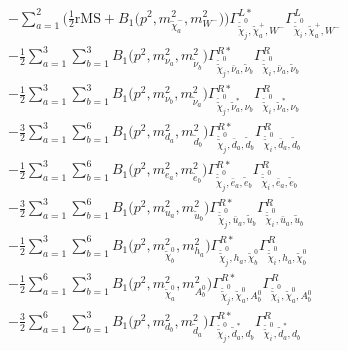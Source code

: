 \begin{itemize}
\begin{align}
 &- \sum_{a=1}^{2}\Big(\frac{1}{2} \text{rMS}  + {B_1\Big(p^{2},m^2_{\tilde{\chi}^-_{{a}}},m^2_{W^-}\Big)}\Big){\Gamma^{L*}_{\check{\tilde{\chi}}^0_{{j}},\tilde{\chi}^+_{{a}},W^-}} {\Gamma^L_{\check{\tilde{\chi}}^0_{{i}},\tilde{\chi}^+_{{a}},W^-}}  \nonumber \\ 
 &-\frac{1}{2} \sum_{a=1}^{3}\sum_{b=1}^{3}{B_1\Big(p^{2},m^2_{\nu_{{a}}},m^2_{\tilde{\nu}_{{b}}}\Big)} {\Gamma^{R*}_{\check{\tilde{\chi}}^0_{{j}},\bar{\nu}_{{a}},\tilde{\nu}_{{b}}}} {\Gamma^R_{\check{\tilde{\chi}}^0_{{i}},\bar{\nu}_{{a}},\tilde{\nu}_{{b}}}}  \nonumber \\ 
 &-\frac{1}{2} \sum_{a=1}^{3}\sum_{b=1}^{3}{B_1\Big(p^{2},m^2_{\nu_{{b}}},m^2_{\tilde{\nu}_{{a}}}\Big)} {\Gamma^{R*}_{\check{\tilde{\chi}}^0_{{j}},\tilde{\nu}^*_{{a}},\nu_{{b}}}} {\Gamma^R_{\check{\tilde{\chi}}^0_{{i}},\tilde{\nu}^*_{{a}},\nu_{{b}}}}  \nonumber \\ 
 &-\frac{3}{2} \sum_{a=1}^{3}\sum_{b=1}^{6}{B_1\Big(p^{2},m^2_{d_{{a}}},m^2_{\tilde{d}_{{b}}}\Big)} {\Gamma^{R*}_{\check{\tilde{\chi}}^0_{{j}},\bar{d}_{{a}},\tilde{d}_{{b}}}} {\Gamma^R_{\check{\tilde{\chi}}^0_{{i}},\bar{d}_{{a}},\tilde{d}_{{b}}}}  \nonumber \\ 
 &-\frac{1}{2} \sum_{a=1}^{3}\sum_{b=1}^{6}{B_1\Big(p^{2},m^2_{e_{{a}}},m^2_{\tilde{e}_{{b}}}\Big)} {\Gamma^{R*}_{\check{\tilde{\chi}}^0_{{j}},\bar{e}_{{a}},\tilde{e}_{{b}}}} {\Gamma^R_{\check{\tilde{\chi}}^0_{{i}},\bar{e}_{{a}},\tilde{e}_{{b}}}}  \nonumber \\ 
 &-\frac{3}{2} \sum_{a=1}^{3}\sum_{b=1}^{6}{B_1\Big(p^{2},m^2_{u_{{a}}},m^2_{\tilde{u}_{{b}}}\Big)} {\Gamma^{R*}_{\check{\tilde{\chi}}^0_{{j}},\bar{u}_{{a}},\tilde{u}_{{b}}}} {\Gamma^R_{\check{\tilde{\chi}}^0_{{i}},\bar{u}_{{a}},\tilde{u}_{{b}}}}  \nonumber \\ 
 &-\frac{1}{2} \sum_{a=1}^{3}\sum_{b=1}^{6}{B_1\Big(p^{2},m^2_{\tilde{\chi}^0_{{b}}},m^2_{h_{{a}}}\Big)} {\Gamma^{R*}_{\check{\tilde{\chi}}^0_{{j}},h_{{a}},\tilde{\chi}^0_{{b}}}} {\Gamma^R_{\check{\tilde{\chi}}^0_{{i}},h_{{a}},\tilde{\chi}^0_{{b}}}}  \nonumber \\ 
 &-\frac{1}{2} \sum_{a=1}^{6}\sum_{b=1}^{3}{B_1\Big(p^{2},m^2_{\tilde{\chi}^0_{{a}}},m^2_{A^0_{{b}}}\Big)} {\Gamma^{R*}_{\check{\tilde{\chi}}^0_{{j}},\tilde{\chi}^0_{{a}},A^0_{{b}}}} {\Gamma^R_{\check{\tilde{\chi}}^0_{{i}},\tilde{\chi}^0_{{a}},A^0_{{b}}}}  \nonumber \\ 
 &-\frac{3}{2} \sum_{a=1}^{6}\sum_{b=1}^{3}{B_1\Big(p^{2},m^2_{d_{{b}}},m^2_{\tilde{d}_{{a}}}\Big)} {\Gamma^{R*}_{\check{\tilde{\chi}}^0_{{j}},\tilde{d}^*_{{a}},d_{{b}}}} {\Gamma^R_{\check{\tilde{\chi}}^0_{{i}},\tilde{d}^*_{{a}},d_{{b}}}}  \nonumber \\ 

\end{align}
\end{itemize}
